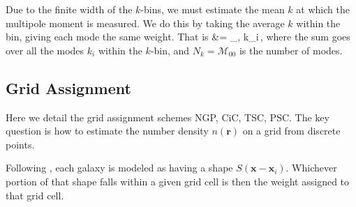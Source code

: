 \documentclass[aps,prd,reprint,floatfix,superscriptaddress,showkeys,nofootinbib]{revtex4-1}
\def\ba#1\ea{\begin{align}#1\end{align}}
\def\vr{{\bm{r}}}
\def\vx{{\bm{x}}}
\begin{document}
Due to the finite width of the $k$-bins, we must estimate the mean $k$ at which
the multipole moment is measured. We do this by taking the average $k$ within
the bin, giving each mode the same weight. That is
\ba
k &=  \sum_{\mu,\phi} k_i\,,
\ea
where the sum goes over all the modes $k_i$ within the $k$-bin, and
$N_k=\mathcal{M}_{00}$ is the number of modes.


\subsection{Grid Assignment}
\label{sec:grid_assignment}
Here we detail the grid assignment schemes NGP, CiC, TSC, PSC. The key question
is how to estimate the number density $n(\vr)$ on a grid from discrete points.

Following \citet{Birdsall+:1969JCoPh...3..494B, Jing:2005ApJ...620..559J}, each
galaxy is modeled as having a shape $S(\vx - \vx_i)$. Whichever portion of that
shape falls within a given grid cell is then the weight assigned to that grid
cell.
\end{document}
